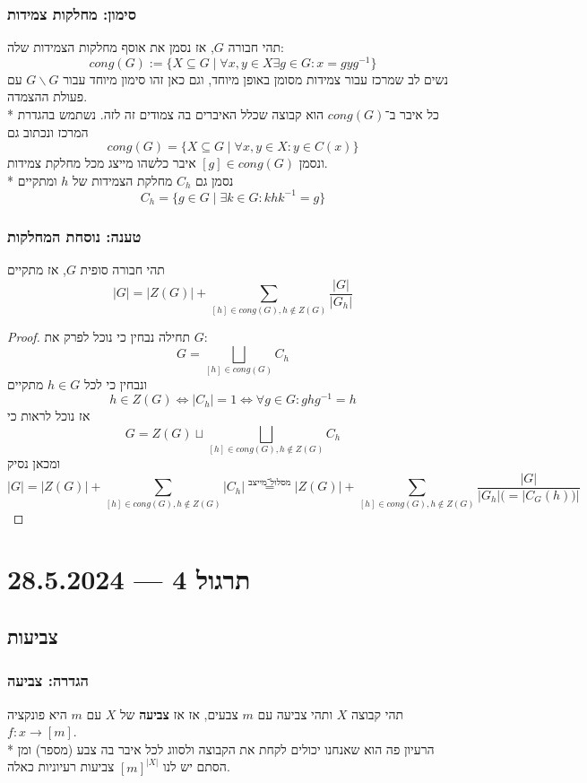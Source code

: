 \subsubsection{סימון: מחלקות צמידות}
תהי חבורה $G$, אז נסמן את אוסף מחלקות הצמידות שלה:
\[
	cong(G) := \{ X \subseteq G \mid \forall x, y \in X \exists g \in G : x = g y g^{-1} \}
\]
נשים לב שמרכז עבור צמידות מסומן באופן מיוחד, וגם כאן זהו סימון מיוחד עבור $G \backslash G$ עם פעולת ההצמדה. \\*
כל איבר ב־$cong(G)$ הוא קבוצה שכלל האיברים בה צמודים זה לזה.
נשתמש בהגדרת המרכז ונכתוב גם
\[
	cong(G) = \{ X \subseteq G \mid \forall x, y \in X : y \in C(x) \}
\]
ונסמן $[g] \in cong(G)$ איבר כלשהו מייצג מכל מחלקת צמידות. \\*
נסמן גם $C_h$ מחלקת הצמידות של $h$ ומתקיים
\[
	C_h = \{ g \in G \mid \exists k \in G : k h k^{-1} = g \}
\]

\subsubsection{טענה: נוסחת המחלקות}
תהי חבורה סופית $G$, אז מתקיים
\[
	|G| = |Z(G)| + \sum_{[h] \in cong(G), h \notin Z(G)} \frac{|G|}{|G_h|}
\]
\begin{proof}
	תחילה נבחין כי נוכל לפרק את $G$:
	\[
		G = \bigsqcup_{[h] \in cong(G)} C_h
	\]
	ונבחין כי לכל $h \in G$ מתקיים
	\[
		h \in Z(G)
		\iff
		|C_h| = 1
		\iff
		\forall g \in G : g h g^{-1} = h
	\]
	אז נוכל לראות כי
	\[
		G = Z(G) \sqcup \bigsqcup_{[h] \in cong(G), h \notin Z(G)} C_h
	\]
	ומכאן נסיק
	\[
		|G|
		= |Z(G)| + \sum_{[h] \in cong(G), h \notin Z(G)} |C_h|
		\overset{\text{מסלול־מייצב}}{=} |Z(G)| + \sum_{[h] \in cong(G), h \notin Z(G)} \frac{|G|}{|G_h| (= |C_G(h))|}
	\]
\end{proof}

\section{תרגול 4 --- 28.5.2024}
\subsection{צביעות}
\subsubsection{הגדרה: צביעה}
תהי קבוצה $X$ ותהי צביעה עם $m$ צבעים, אז אז \textbf{צביעה} של $X$ עם $m$ היא פונקציה $f : x \to [m]$. \\*
הרעיון פה הוא שאנחנו יכולים לקחת את הקבוצה ולסווג לכל איבר בה צבע (מספר) ומן הסתם יש לנו ${[m]}^{|X|}$ צביעות רעיוניות כאלה.

